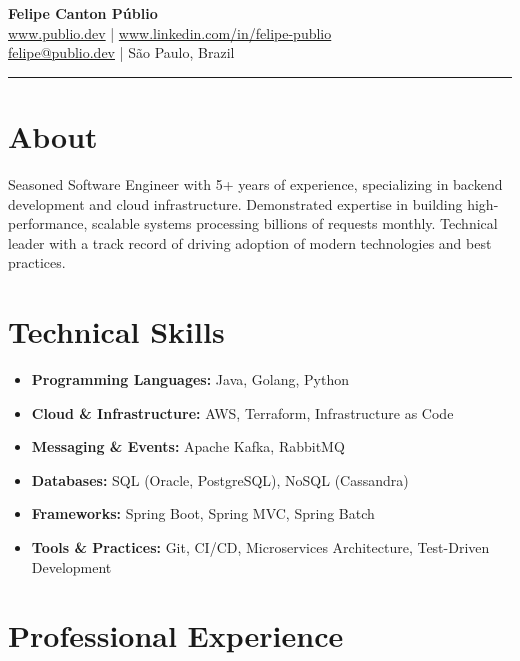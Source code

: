 \documentclass[a4paper,10pt]{article}
\begin{document}
\pagestyle{empty}

\begin{center}
    {\Huge \textbf{Felipe Canton Públio}} \\
    \vspace{4mm}
    \href{https://www.publio.dev}{www.publio.dev} | \href{https://www.linkedin.com/in/felipe-publio}{www.linkedin.com/in/felipe-publio} \\
    \vspace{2mm}
    \href{mailto:felipe@publio.dev}{felipe@publio.dev} | São Paulo, Brazil
\end{center}

\vspace{3mm}
\hrule
\vspace{3mm}

\section*{About}
Seasoned Software Engineer with 5+ years of experience, specializing in backend development and cloud infrastructure. Demonstrated expertise in building high-performance, scalable systems processing billions of requests monthly. Technical leader with a track record of driving adoption of modern technologies and best practices.

\section*{Technical Skills}
\begin{itemize}[leftmargin=*]
    \item \textbf{Programming Languages:} Java, Golang, Python
    \item \textbf{Cloud \& Infrastructure:} AWS, Terraform, Infrastructure as Code
    \item \textbf{Messaging \& Events:} Apache Kafka, RabbitMQ
    \item \textbf{Databases:} SQL (Oracle, PostgreSQL), NoSQL (Cassandra)
    \item \textbf{Frameworks:} Spring Boot, Spring MVC, Spring Batch
    \item \textbf{Tools \& Practices:} Git, CI/CD, Microservices Architecture, Test-Driven Development
\end{itemize}

\section*{Professional Experience}
\end{document}
